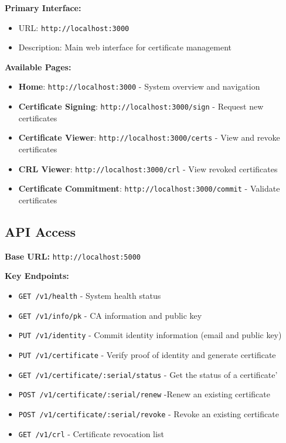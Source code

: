 \textbf{Primary Interface:}
\begin{itemize}
    \item URL: \texttt{http://localhost:3000}
    \item Description: Main web interface for certificate management
\end{itemize}

\textbf{Available Pages:}
\begin{itemize}
    \item \textbf{Home}: \texttt{http://localhost:3000} - System overview and navigation
    \item \textbf{Certificate Signing}: \texttt{http://localhost:3000/sign} - Request new certificates
    \item \textbf{Certificate Viewer}: \texttt{http://localhost:3000/certs} - View and revoke certificates
    \item \textbf{CRL Viewer}: \texttt{http://localhost:3000/crl} - View revoked certificates
    \item \textbf{Certificate Commitment}: \texttt{http://localhost:3000/commit} - Validate certificates
\end{itemize}

\subsection{API Access}

\textbf{Base URL:} \texttt{http://localhost:5000}

\textbf{Key Endpoints:}
\begin{itemize}
    \item \texttt{GET /v1/health} - System health status
    \item \texttt{GET /v1/info/pk} - CA information and public key
    \item \texttt{PUT /v1/identity} - Commit identity information (email and public key)
    \item \texttt{PUT /v1/certificate} - Verify proof of identity and generate certificate
    \item \texttt{GET /v1/certificate/:serial/status} - Get the status of a certificate'
    \item \texttt{POST /v1/certificate/:serial/renew} -Renew an existing certificate
    \item \texttt{POST /v1/certificate/:serial/revoke} - Revoke an existing certificate
    \item \texttt{GET /v1/crl} - Certificate revocation list
\end{itemize}

